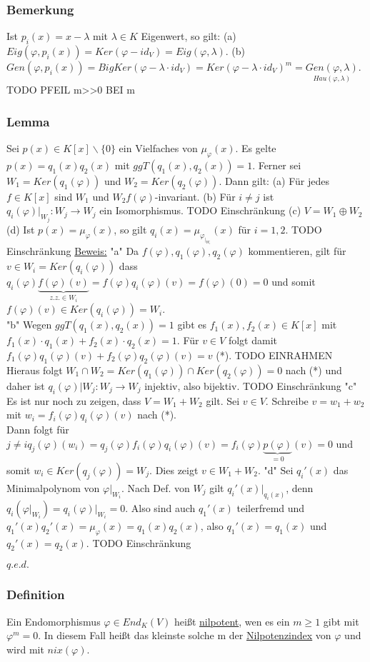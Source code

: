 \documentclass[a4paper]{article}
\newcommand{\ul}{\underline}
\renewcommand{\qed}{\begin{flushright}
\ul{\(q.e.d.\)}
\end{flushright}}
\let\phi\varphi
\begin{document}
\subsubsection{Bemerkung}
Ist \(p_i(x)=x-\lambda\) mit \(\lambda\in K\) Eigenwert, so gilt:
(a) \(Eig(\phi,p_i(x))=Ker(\phi-id_V)=Eig(\phi,\lambda)\).
(b) \(Gen(\phi,p_i(x))=BigKer(\phi-\lambda\cdot id_V)=Ker(\phi-\lambda\cdot id_V)^m=\underset{Hau(\phi, \lambda)}{Gen(\phi, \lambda)}\). TODO PFEIL m>>0 BEI m
\subsubsection{Lemma}
Sei \(p(x)\in K[x]\backslash\{0\}\) ein Vielfaches von \(\mu_\phi(x)\). Es gelte \(p(x)=q_1(x)q_2(x)\) mit \(ggT(q_1(x),q_2(x))=1\). Ferner sei \(W_1=Ker(q_1(\phi))\) und \(W_2=Ker(q_2(\phi))\). Dann gilt:
(a) Für jedes \(f\in K[x]\) sind \(W_1\) und \(W_2 f(\phi)\)-invariant.
(b) Für \(i \neq j\) ist \(q_i(\phi)\Big|_{W_j}: W_j \rightarrow W_j\) ein Isomorphismus. TODO Einschränkung
(c) \(V=W_1 \oplus W_2\)
(d) Ist \(p(x)=\mu_\phi(x)\), so gilt \(q_i(x)=\mu_{\phi_{|_{W_i}}}(x)\) für \(i=1,2\). TODO Einschränkung
\ul{Beweis:}
"a" Da \(f(\phi),q_1(\phi),q_2(\phi)\) kommentieren, gilt für \(v\in W_i=Ker(q_i(\phi))\) dass \(q_i(\phi)\underbrace{f(\phi)(v)}_{z.z.\in W_i}=f(\phi)q_i(\phi)(v)=f(\phi)(0)=0\) und somit \(f(\phi)(v)\in Ker(q_i(\phi))=W_i\).\\
"b" Wegen \(ggT(q_1(x),q_2(x))=1\) gibt es \(f_1(x),f_2(x)\in K[x]\) mit \(f_1(x)\cdot q_1(x)+f_2(x)\cdot q_2(x)=1\). Für \(v\in V\) folgt damit \(f_1(\phi)q_1(\phi)(v)+f_2(\phi)q_2(\phi)(v)=v\) (*). TODO EINRAHMEN\\
Hieraus folgt \(W_1 \cap W_2 = Ker(q_1(\phi)) \cap Ker(q_2(\phi))={0}\) nach (*) und daher ist \(q_i(\phi)|W_j:W_j\rightarrow W_j\) injektiv, also bijektiv. TODO Einschränkung
"c" Es ist nur noch zu zeigen, dass \(V=W_1+W_2\) gilt. Sei \(v\in V\). Schreibe \(v=w_1+w_2\) mit \(w_i=f_i(\phi)q_i(\phi)(v)\) nach (*).\\
Dann folgt für \(j \neq i q_j(\phi)(w_i)=q_j(\phi)f_i(\phi)q_i(\phi)(v)=f_i(\phi)\underbrace{p(\phi)}_{=0}(v)=0\) und somit \(w_i\in Ker(q_j(\phi))=W_j\). Dies zeigt \(v\in W_1+W_2\).
"d" Sei \(q_i'(x)\) das Minimalpolynom von \(\phi\Big|_{W_i}\).
Nach Def. von \(W_j\) gilt \(q_i'(x)\Big|_{q_i(x)}\), denn \(q_i(\phi\Big|_{W_i})=q_i(\phi)\Big|_{W_i}=0\).
Also sind auch \(q_1'(x)\) teilerfremd und \(q_1'(x)q_2'(x)=\mu_\phi(x)=q_1(x)q_2(x)\), also \(q_1'(x)=q_1(x)\) und \(q_2'(x)=q_2(x)\). TODO Einschränkung
\qed
\subsubsection{Definition}
Ein Endomorphismus \(\phi\in End_K(V)\) heißt \ul{nilpotent}, wen es ein \(m\geq 1\) gibt mit \(\phi^m=0\). In diesem Fall heißt das kleinste solche m der \ul{Nilpotenzindex} von \(\phi\) und wird mit \(nix(\phi)\).
\end{document}
